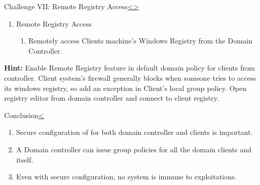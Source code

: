 \documentclass[12pt]{extarticle}
\newenvironment{instructionblock}{\Large\bgroup}{\egroup}
\begin{document}
\vfill






\pagebreak
\begin{slide}{Challenge VII: Remote Registry Access}{\hyperref[slide 24]{\textless}\hyperref[slide 26]{\textgreater}}
	\begin{instructionblock}
		\begin{enumerate}
			\item Remote Registry Access
			\begin{enumerate}
				\item Remotely access Clients machine's Windows Registry from the Domain Controller.
			\end{enumerate}
			
		\end{enumerate}
	\end{instructionblock}
\end{slide}

\vspace{2mm}
\noindent
\textbf{Hint:} Enable Remote Registry feature in default domain policy for clients from controller. Client system's firewall generally blocks when someone tries to access its windows registry, so add an exception in Client's local group policy. Open registry editor from domain controller and connect to client registry.

\vfill




\pagebreak
\begin{slide}{Conclusion}{\hyperref[slide 25]{\textless}}
	\begin{instructionblock}
		\begin{enumerate}
			\item Secure configuration of for both domain controller and clients is important.
			\item A Domain controller can issue group policies for all the domain clients and itself.
			\item Even with secure configuration, no system is immune to exploitations.
		\end{enumerate}
	\end{instructionblock}
\end{slide}
\end{document}
